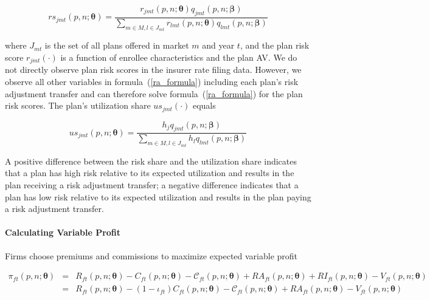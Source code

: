\documentclass[12pt]{article}
\begin{document}
\vspace{-0.1in}

	$$
	rs_{jmt}(\textit{p},\textit{n};\boldsymbol{\theta}) = \frac{ r_{jmt}(\textit{p},\textit{n};\boldsymbol{\theta}) q_{jmt}(\textit{p},\textit{n};\boldsymbol{\beta})}{\sum_{m \in M, l \in J_{mt}}  r_{lmt}(\textit{p},\textit{n};\boldsymbol{\theta}) q_{lmt}(\textit{p},\textit{n};\boldsymbol{\beta})}
	$$


\noindent where $J_{mt}$ is the set of all plans offered in market $m$ and year $t$, and the plan risk score $r_{jmt}(\cdot)$ is a function of enrollee characteristics and the plan AV. We do not directly observe plan risk scores in the insurer rate filing data.  However, we observe all other variables in formula~(\ref{ra_formula}) including each plan's risk adjustment transfer and can therefore solve formula~(\ref{ra_formula}) for the plan risk scores. The plan's utilization share $us_{jmt}(\cdot)$ equals

\vspace{-0.1in}



	$$
	us_{jmt}(\textit{p},\textit{n};\boldsymbol{\theta}) =  \frac{ h_j q_{jmt}(\textit{p},\textit{n};\boldsymbol{\beta})}{\sum_{m \in M, l \in J_{mt}} h_l q_{lmt}(\textit{p},\textit{n};\boldsymbol{\beta})}
	$$

\noindent A positive difference between the risk share and the utilization share indicates that a plan has high risk relative to its expected utilization and results in the plan receiving a risk adjustment transfer; a negative difference indicates that a plan has low risk relative to its expected utilization and results in the plan paying a risk adjustment transfer.



 
\paragraph{Calculating Variable Profit} 
 
 
 Firms choose premiums and commissions to maximize expected variable profit

	\vspace{-0.4in}		
	\begin{footnotesize}

	\begin{eqnarray}\label{profit}
	\pi_{ft}(\textit{p},\textit{n};\boldsymbol{\theta}) &=&  R_{ft}(\textit{p},\textit{n};\boldsymbol{\theta}) -  C_{ft}(\textit{p},\textit{n};\boldsymbol{\theta}) - \mathcal{C}_{ft}(\textit{p},\textit{n};\boldsymbol{\theta}) + RA_{ft}(\textit{p},\textit{n};\boldsymbol{\theta}) +  RI_{ft}(\textit{p},\textit{n};\boldsymbol{\theta})  - V_{ft}(\textit{p},\textit{n};\boldsymbol{\theta})  \nonumber \\
	&=& R_{ft}(\textit{p},\textit{n};\boldsymbol{\theta}) - (1 - \iota_{ft}) C_{ft}(\textit{p},\textit{n};\boldsymbol{\theta}) - \mathcal{C}_{ft}(\textit{p},\textit{n};\boldsymbol{\theta}) + RA_{ft}(\textit{p},\textit{n};\boldsymbol{\theta})   - V_{ft}(\textit{p},\textit{n};\boldsymbol{\theta}) 
	\end{eqnarray}
		
	\end{footnotesize}
		
\end{document}
